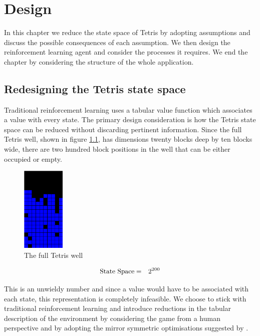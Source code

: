 \documentclass{rucsthesis}
\begin{document}
\chapter{Design}

In this chapter we reduce the state space of Tetris by adopting assumptions and discuss the possible consequences of each assumption. We then design the reinforcement learning agent and consider the processes it requires. We end the chapter by considering the structure of the whole application.

\section{Redesigning the Tetris state space \label{design}}

Traditional reinforcement learning uses a tabular value function which associates a value with every state. The primary design consideration is how the Tetris state space can be reduced without discarding pertinent information. Since the full Tetris well, shown in figure \ref{fig:fullwell}, has dimensions twenty blocks deep by ten blocks wide, there are two hundred block positions in the well that can be either occupied or empty.

\begin{figure}[h]
\centering
\includegraphics[width=0.8in]{fullwell.png}
\caption{The full Tetris well}
\label{fig:fullwell}
\end{figure}

\begin{eqnarray*}
\centering
\textrm{State Space} & = & 2^{200} 
\end{eqnarray*}

This is an unwieldy number and since a value would have to be associated with each state, this representation is completely infeasible. We choose to stick with traditional reinforcement learning and introduce reductions in the tabular description of the environment by considering the game from a human perspective and by adopting the mirror symmetric optimisations suggested by \cite{yaeltetris}. 
\end{document}
